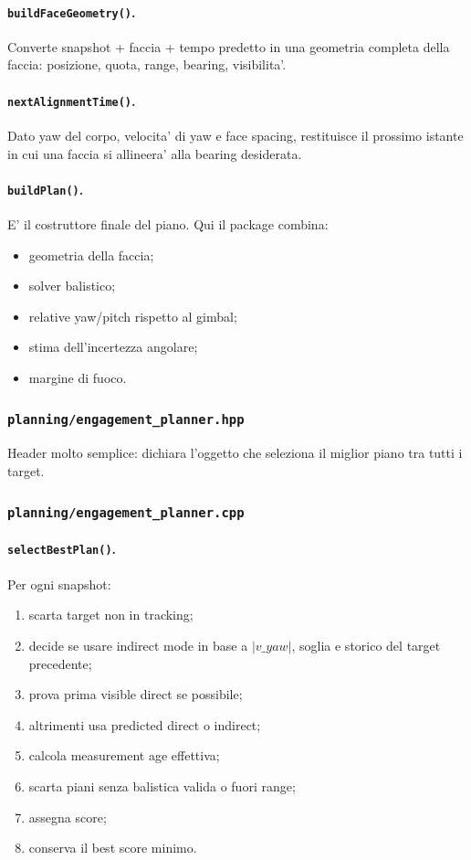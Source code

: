 \documentclass[11pt,a4paper]{article}
\newcommand{\code}[1]{\texttt{#1}}
\begin{document}
\paragraph{\code{buildFaceGeometry()}.}
Converte snapshot + faccia + tempo predetto in una geometria completa della faccia: posizione, quota, range, bearing, visibilita'.

\paragraph{\code{nextAlignmentTime()}.}
Dato yaw del corpo, velocita' di yaw e face spacing, restituisce il prossimo istante in cui una faccia si allineera' alla bearing desiderata.

\paragraph{\code{buildPlan()}.}
E' il costruttore finale del piano. Qui il package combina:
\begin{itemize}[leftmargin=1.4em]
  \item geometria della faccia;
  \item solver balistico;
  \item relative yaw/pitch rispetto al gimbal;
  \item stima dell'incertezza angolare;
  \item margine di fuoco.
\end{itemize}

\subsubsection{\code{planning/engagement\_planner.hpp}}

Header molto semplice: dichiara l'oggetto che seleziona il miglior piano tra tutti i target.

\subsubsection{\code{planning/engagement\_planner.cpp}}

\paragraph{\code{selectBestPlan()}.}
Per ogni snapshot:
\begin{enumerate}[leftmargin=1.4em]
  \item scarta target non in tracking;
  \item decide se usare indirect mode in base a \(|v\_yaw|\), soglia e storico del target precedente;
  \item prova prima visible direct se possibile;
  \item altrimenti usa predicted direct o indirect;
  \item calcola measurement age effettiva;
  \item scarta piani senza balistica valida o fuori range;
  \item assegna score;
  \item conserva il best score minimo.
\end{enumerate}
\end{document}

